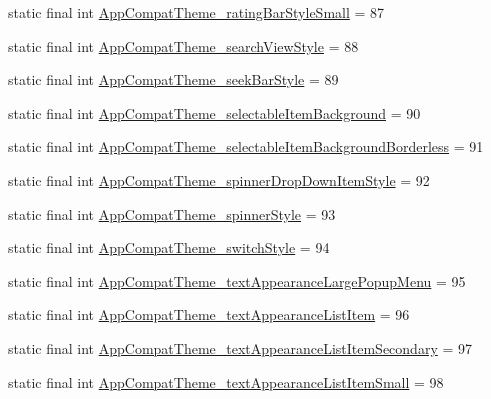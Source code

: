 \begin{DoxyCompactItemize}
\item 
static final int \mbox{\hyperlink{classandroid_1_1support_1_1design_1_1_r_1_1styleable_aece000457864e87bc2e712c789af23a5}{App\+Compat\+Theme\+\_\+rating\+Bar\+Style\+Small}} = 87
\item 
static final int \mbox{\hyperlink{classandroid_1_1support_1_1design_1_1_r_1_1styleable_a2337ef5894fe6bee67c747709a656df8}{App\+Compat\+Theme\+\_\+search\+View\+Style}} = 88
\item 
static final int \mbox{\hyperlink{classandroid_1_1support_1_1design_1_1_r_1_1styleable_a4744a84db621d695271362701ee808d2}{App\+Compat\+Theme\+\_\+seek\+Bar\+Style}} = 89
\item 
static final int \mbox{\hyperlink{classandroid_1_1support_1_1design_1_1_r_1_1styleable_a8db61c7d24d29815158068e748d36b77}{App\+Compat\+Theme\+\_\+selectable\+Item\+Background}} = 90
\item 
static final int \mbox{\hyperlink{classandroid_1_1support_1_1design_1_1_r_1_1styleable_ac2dc2f43f68e02bd349adaaef7248181}{App\+Compat\+Theme\+\_\+selectable\+Item\+Background\+Borderless}} = 91
\item 
static final int \mbox{\hyperlink{classandroid_1_1support_1_1design_1_1_r_1_1styleable_a2aec6ade4ae94164a4ed938809d6193a}{App\+Compat\+Theme\+\_\+spinner\+Drop\+Down\+Item\+Style}} = 92
\item 
static final int \mbox{\hyperlink{classandroid_1_1support_1_1design_1_1_r_1_1styleable_aa3c3a41a91ab59cdfcb27c08c9481bf9}{App\+Compat\+Theme\+\_\+spinner\+Style}} = 93
\item 
static final int \mbox{\hyperlink{classandroid_1_1support_1_1design_1_1_r_1_1styleable_a5a94f43c80174711f145800235c41f96}{App\+Compat\+Theme\+\_\+switch\+Style}} = 94
\item 
static final int \mbox{\hyperlink{classandroid_1_1support_1_1design_1_1_r_1_1styleable_a1636a118070d64a095e1298adcaa6bf5}{App\+Compat\+Theme\+\_\+text\+Appearance\+Large\+Popup\+Menu}} = 95
\item 
static final int \mbox{\hyperlink{classandroid_1_1support_1_1design_1_1_r_1_1styleable_a5d1d6972dd1ae78bc1c4f5323d531648}{App\+Compat\+Theme\+\_\+text\+Appearance\+List\+Item}} = 96
\item 
static final int \mbox{\hyperlink{classandroid_1_1support_1_1design_1_1_r_1_1styleable_ad0a32a60579b4e2c4ad18aab20436246}{App\+Compat\+Theme\+\_\+text\+Appearance\+List\+Item\+Secondary}} = 97
\item 
static final int \mbox{\hyperlink{classandroid_1_1support_1_1design_1_1_r_1_1styleable_a7c4f1b5ec2a28ae949857c9fa797a276}{App\+Compat\+Theme\+\_\+text\+Appearance\+List\+Item\+Small}} = 98

\end{DoxyCompactItemize}
